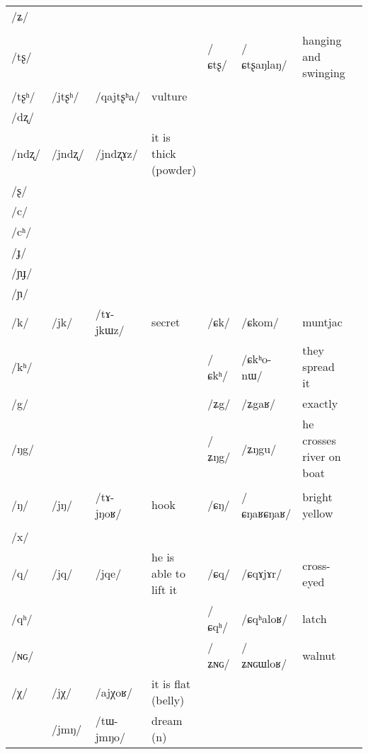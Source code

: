 \documentclass[oneside,a4paper,11pt]{article}
\newcommand{\ipa}[1]{\mbox{\phon/#1/}}
\newcommand{\deux}[1]{\ipa{#1}\addtocounter{2clusters}{1}}
\newcommand{\trois}[1]{\ipa{#1}\addtocounter{3clusters}{1}}
\newcommand{\idph}[1]{\cellcolor{gray}\textbf{#1}}
\newcommand{\resetcounters}[2]{
\newcounter{#1}
\newcounter{#2}
 \setcounter{#1}{\value{2clusters}}
  \setcounter{#2}{\value{3clusters}}
 \setcounter{2clusters}{0}
  \setcounter{3clusters}{0}
}
\begin{document}
\begin{table}
{\begin{tabular}{l|lll|lll|l}
\ipa{ʑ}  & 	  & 	  & 	  & 	  & 	  & 	  & 	\\
\ipa{tʂ}  & 	  & 	  & 	  & 	 \deux{ɕtʂ} \idph{}  & 	 \ipa{ɕtʂaŋlaŋ}  & 	 hanging and swinging & 	\\
\ipa{tʂʰ}  & 	 \deux{jtʂʰ}  & 	 \ipa{qajtʂʰa}  & 	vulture  & 	  & 	  & 	  & 	\\
\ipa{dʐ}  & 	  & 	  & 	  & 	  & 	  & 	  & 	\\
\ipa{ndʐ}  & 	 \deux{jndʐ}  & 	 \ipa{jndʐɤz}  & 	it is thick (powder)  & 	  & 	  & 	  & 	\\
\ipa{ʂ}  & 	  & 	  & 	  & 	  & 	  & 	  & 	\\
\ipa{c}  & 	  & 	  & 	  & 	  & 	  & 	  & 	\\
\ipa{cʰ}  & 	  & 	  & 	  & 	  & 	  & 	  & 	\\
\ipa{ɟ}  & 	  & 	  & 	  & 	  & 	  & 	  & 	\\
\ipa{ɲɟ}  & 	  & 	  & 	  & 	  & 	  & 	  & 	\\
\ipa{ɲ}  & 	  & 	  & 	  & 	  & 	  & 	  & 	\\
\ipa{k}  &	 \deux{jk}  &	 \ipa{tɤ-jkɯz}  &	 secret  &	 \deux{ɕk}  &	 \ipa{ɕkom}  &	 muntjac  &	\\
\ipa{kʰ}  &	  &	  &	  &	 \deux{ɕkʰ}  &	 \ipa{ɕkʰo-nɯ}  &	 they spread it  &	\\
\ipa{g}  &	  &	  &	  &	 \deux{ʑg}  &	 \ipa{ʑgaʁ}  &	 exactly  &	\\
\ipa{ŋg}  &	  &	  &	  &	 \deux{ʑŋg}  &	 \ipa{ʑŋgu}  &	 he crosses river on boat  &	\\
\ipa{ŋ}  &	 \deux{jŋ}  &	 \ipa{tɤ-jŋoʁ}  &	 hook  &	 \deux{ɕŋ} \idph{}  &	 \ipa{ɕŋaʁɕŋaʁ}  &	 bright yellow  &	\\
\ipa{x}  &	  &	  &	  &	  &	  &	  &	\\
\ipa{q}  &	 \deux{jq}  &	 \ipa{jqe}  &	 he is able to lift it  &	 \deux{ɕq}  &	 \ipa{ɕqɤjɤr}  &	 cross-eyed  &	\\
\ipa{qʰ}  &	  &	  &	  &	 \deux{ɕqʰ}  &	 \ipa{ɕqʰaloʁ}  &	 latch  &	\\
\ipa{ɴɢ}  &	  &	  &	  &	 \deux{ʑɴɢ}  &	 \ipa{ʑɴɢɯloʁ}  &	 walnut  &	\\
\ipa{χ}  &	 \deux{jχ}  &	 \ipa{ajχoʁ}  &	 it is flat (belly)  &	  &	  &	  &	\\
\midrule  					 
 &\trois{jmŋ} & \ipa{tɯ-jmŋo} &dream (n) \\  
 \bottomrule
  \end{tabular}}
\end{table}
   \resetcounters{2jcC}{3jcC} %
   
\end{document}

